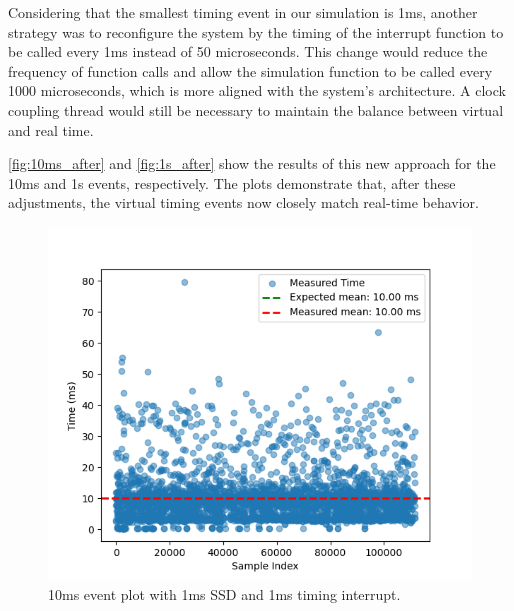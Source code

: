 Considering that the smallest timing event in our simulation is 1ms, another strategy was to reconfigure the system by the timing of the interrupt function to be called every 1ms instead of 50 microseconds. This change would reduce the frequency of function calls and allow the simulation function to be called every 1000 microseconds, which is more aligned with the system's architecture. A clock coupling thread would still be necessary to maintain the balance between virtual and real time.

\autoref{fig:10ms_after}  and \autoref{fig:1s_after} show the results of this new approach for the 10ms and 1s events, respectively. The plots demonstrate that, after these adjustments, the virtual timing events now closely match real-time behavior. 

\begin{figure}[h]
  \centering
  \begin{minipage}{0.49\textwidth}
    \centering
    \includegraphics[width=1\linewidth]{figures/scatter_1000ssd_10ms_new.png}
    \caption{10ms event plot with 1ms SSD and 1ms timing interrupt.} 
    \label{fig:10ms_after}
  \end{minipage}
  \hfill
  \begin{minipage}{0.5\textwidth}
    \centering

\end{minipage}
\end{figure}
